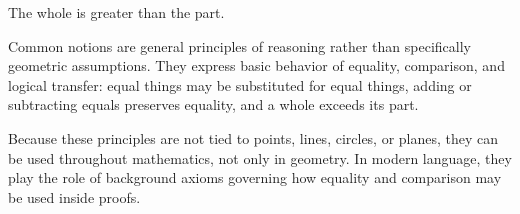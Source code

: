 \begin{axiom}
\label{ax-euclid-common-notion-whole-greater-than-part}
The whole is greater than the part.
\end{axiom}
\begin{lra-not-visible}
\NoLocalDependencies
\end{lra-not-visible}

\begin{remark*}[Exposition]
Common notions are general principles of reasoning rather than specifically
geometric assumptions. They express basic behavior of equality, comparison, and
logical transfer: equal things may be substituted for equal things, adding or
subtracting equals preserves equality, and a whole exceeds its part.

Because these principles are not tied to points, lines, circles, or planes,
they can be used throughout mathematics, not only in geometry. In modern
language, they play the role of background axioms governing how equality and
comparison may be used inside proofs.
\end{remark*}
